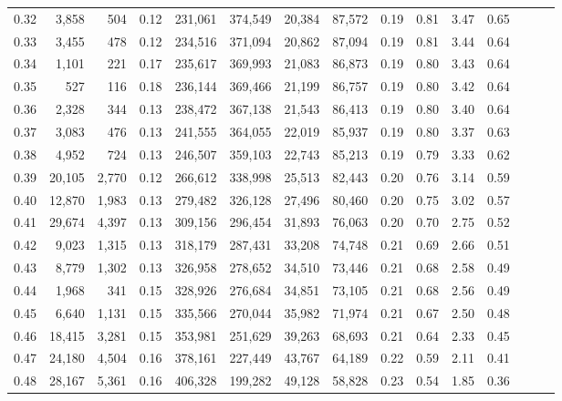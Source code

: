 \begin{tabular}{rrrrrrrrrrrrrrr}
0.32 &   3,858 &    504 &  0.12 &  231,061 &  374,549 &   20,384 &   87,572 &  0.19 &  0.81 &  3.47 &      0.65 \\
0.33 &   3,455 &    478 &  0.12 &  234,516 &  371,094 &   20,862 &   87,094 &  0.19 &  0.81 &  3.44 &      0.64 \\
0.34 &   1,101 &    221 &  0.17 &  235,617 &  369,993 &   21,083 &   86,873 &  0.19 &  0.80 &  3.43 &      0.64 \\
0.35 &     527 &    116 &  0.18 &  236,144 &  369,466 &   21,199 &   86,757 &  0.19 &  0.80 &  3.42 &      0.64 \\
0.36 &   2,328 &    344 &  0.13 &  238,472 &  367,138 &   21,543 &   86,413 &  0.19 &  0.80 &  3.40 &      0.64 \\
0.37 &   3,083 &    476 &  0.13 &  241,555 &  364,055 &   22,019 &   85,937 &  0.19 &  0.80 &  3.37 &      0.63 \\
0.38 &   4,952 &    724 &  0.13 &  246,507 &  359,103 &   22,743 &   85,213 &  0.19 &  0.79 &  3.33 &      0.62 \\
0.39 &  20,105 &  2,770 &  0.12 &  266,612 &  338,998 &   25,513 &   82,443 &  0.20 &  0.76 &  3.14 &      0.59 \\
0.40 &  12,870 &  1,983 &  0.13 &  279,482 &  326,128 &   27,496 &   80,460 &  0.20 &  0.75 &  3.02 &      0.57 \\
0.41 &  29,674 &  4,397 &  0.13 &  309,156 &  296,454 &   31,893 &   76,063 &  0.20 &  0.70 &  2.75 &      0.52 \\
0.42 &   9,023 &  1,315 &  0.13 &  318,179 &  287,431 &   33,208 &   74,748 &  0.21 &  0.69 &  2.66 &      0.51 \\
0.43 &   8,779 &  1,302 &  0.13 &  326,958 &  278,652 &   34,510 &   73,446 &  0.21 &  0.68 &  2.58 &      0.49 \\
0.44 &   1,968 &    341 &  0.15 &  328,926 &  276,684 &   34,851 &   73,105 &  0.21 &  0.68 &  2.56 &      0.49 \\
0.45 &   6,640 &  1,131 &  0.15 &  335,566 &  270,044 &   35,982 &   71,974 &  0.21 &  0.67 &  2.50 &      0.48 \\
0.46 &  18,415 &  3,281 &  0.15 &  353,981 &  251,629 &   39,263 &   68,693 &  0.21 &  0.64 &  2.33 &      0.45 \\
0.47 &  24,180 &  4,504 &  0.16 &  378,161 &  227,449 &   43,767 &   64,189 &  0.22 &  0.59 &  2.11 &      0.41 \\
0.48 &  28,167 &  5,361 &  0.16 &  406,328 &  199,282 &   49,128 &   58,828 &  0.23 &  0.54 &  1.85 &      0.36 \\

\end{tabular}
